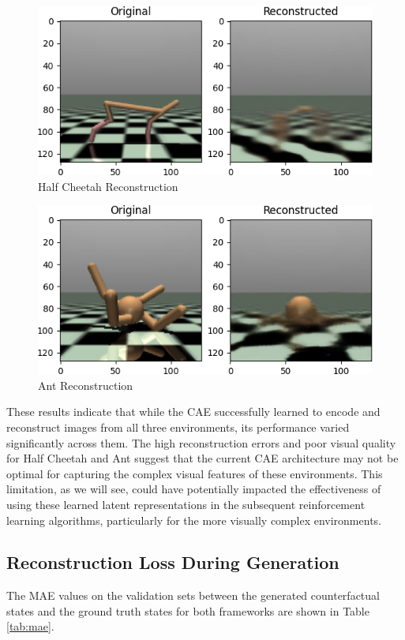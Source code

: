 \begin{figure}[h]
    \centering
    \includegraphics[width=.6\textwidth]{figures/ch5/ae_half_cheetah.png}
    \caption{Half Cheetah Reconstruction}
    \label{fig:half_cheetah_recon}
\end{figure}

\begin{figure}[h]
    \centering
    \includegraphics[width=.6\textwidth]{figures/ch5/ae_ant.png}
    \caption{Ant Reconstruction}
    \label{fig:ant_recon}
\end{figure}

These results indicate that while the CAE successfully learned to
encode and reconstruct images from all three environments,
its performance varied significantly across them. The high
reconstruction errors and poor visual quality for Half Cheetah
and Ant suggest that the current CAE architecture may not be
optimal for capturing the complex visual features of these environments.
This limitation, as we will see, could have potentially impacted the effectiveness
of using these learned latent representations in the subsequent reinforcement
learning algorithms, particularly for the more visually complex environments.

\subsection{Reconstruction Loss During Generation}

The MAE values on the validation sets
between the generated counterfactual states and the ground truth
states for both frameworks
are shown in Table \ref{tab:mae}.

